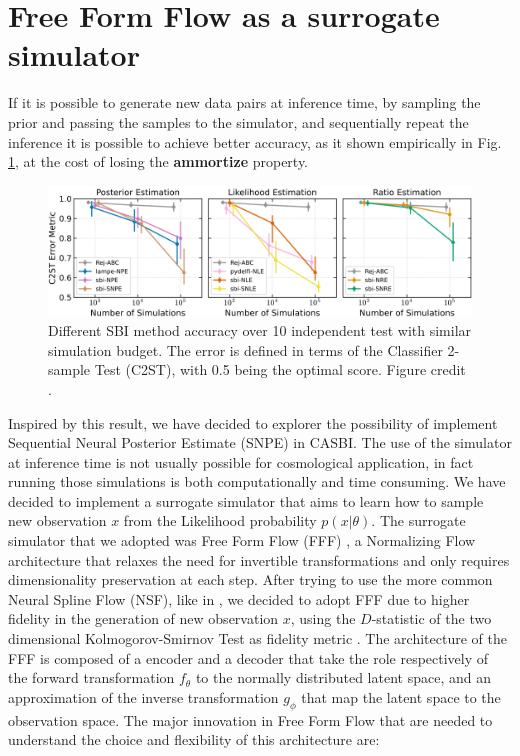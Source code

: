 \section{Free Form Flow as a surrogate simulator} 
If it is possible to generate new data pairs at inference time, by sampling the prior and passing the samples to the simulator, and sequentially repeat the inference it is possible to achieve better accuracy, as it shown empirically in Fig. \ref{fig:sequential_SBI}, at the cost of losing the \textbf{ammortize} property.
\begin{figure}[H]
    \centering
    \includegraphics[width=1\textwidth]{./figure/sequential_SBI.png}
    \caption{Different SBI method accuracy over 10 independent test with similar simulation budget. The error is defined in terms of the Classifier 2-sample Test (C2ST), with 0.5 being the optimal score. Figure credit \cite{hoLtUILIAllinOneFramework2024}. }
    \label{fig:sequential_SBI}
\end{figure}

Inspired by this result, we have decided to explorer the possibility of implement Sequential Neural Posterior Estimate (SNPE) in CASBI. The use of the simulator at inference time is not usually possible for cosmological application, in fact running those simulations is both computationally and time consuming. We have decided to implement a surrogate simulator that aims to learn how to sample new observation $x$ from the Likelihood probability $p(x|\theta)$. The surrogate simulator that we adopted was Free Form Flow (FFF) \cite{draxlerFreeformFlowsMake2024}, a Normalizing Flow architecture that relaxes the need for invertible transformations and only requires dimensionality preservation at each step. After trying to use the more common Neural Spline Flow (NSF), like in \cite{wolfGalacticFlowLearningGeneralized2023}, we decided to adopt FFF due to higher fidelity in the generation of new observation $x$, using the $D$-statistic of the two dimensional Kolmogorov-Smirnov Test as fidelity metric \cite{lopesTwodimensionalKolmogorovSmirnovTest}. The architecture of the FFF is composed of a encoder and a decoder that take the role respectively of the forward transformation $f_\theta$ to the normally distributed latent space, and an approximation of the inverse transformation $g_\phi$ that map the latent space to the observation space. The major innovation in Free Form Flow that are needed to understand the choice and flexibility of this architecture are:


